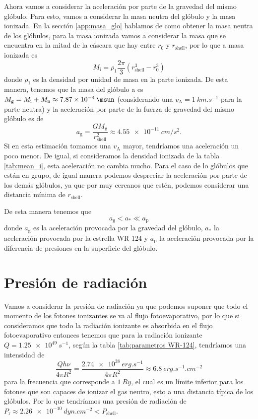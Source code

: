 \documentclass{book}
\begin{document}
Ahora vamos a considerar la aceleración por parte de la gravedad del mismo glóbulo. Para esto, vamos a considerar la masa neutra del glóbulo y la masa ionizada. En la sección \ref{app:masa_glo} hablamos de como obtener la masa neutra de los glóbulos, para la masa ionizada vamos a considerar la masa que se encuentra en la mitad de la cáscara que hay entre $r_0$ y $r_\mathrm{shell}$, por lo que a masa ionizada es
\begin{equation}
    M_\mathrm{i} = \rho_1 \frac{2\pi}{3}(r_\mathrm{shell}^3-r_0^3)
\end{equation}
donde $\rho_1$ es la densidad por unidad de masa en la parte ionizada. De esta manera, tenemos que la masa del glóbulo a es $M_\mathrm{g} = M_\mathrm{i} + M_\mathrm{n} \approx \SI{7.87e-4}{\msun}$ (considerando una $v_\mathrm{A}=\SI{1}{km.s^{-1}}$ para la parte neutra) y la aceleración por parte de la fuerza de gravedad del mismo glóbulo es de
\begin{equation}
a_\mathrm{g}=\frac{G M_\mathrm{g}}{r_\mathrm{shell}^2}\approx \SI{4.55e-11}{cm/s^2}.
\end{equation}
Si en esta estimación tomamos una $v_\mathrm{A}$ mayor, tendríamos una aceleración un poco menor. De igual, si consideramos la densidad ionizada de la tabla \ref{tab:mean_i}, esta aceleración no cambia mucho. Para el caso de lo glóbulos que están en grupo, de igual manera podemos despreciar la aceleración por parte de los demás glóbulos, ya que por muy cercanos que estén, podemos considerar una distancia mínima de $r_\mathrm{shell}$. 

De esta manera tenemos que
\begin{equation}
a_\mathrm{g}<a_*\ll a_\mathrm{p}
\end{equation}
donde $a_\mathrm{g}$ es la aceleración provocada por la gravedad del glóbulo, $a_*$ la aceleración provocada por la estrella WR 124 y $a_\mathrm{p}$ la aceleración provocada por la diferencia de presiones en la superficie del glóbulo.

\section{Presión de radiación}

Vamos a considerar la presión de radiación ya que podemos suponer que todo el momento de los fotones ionizantes se va al flujo fotoevaporativo, por lo que si consideramos que todo la radiación ionizante es absorbida en el flujo fotoevaporativo entonces tenemos que para la radiación ionizante $Q = \SI{1.25e49}{s^{-1}}$, según la tabla \ref{tab:parametros WR-124}, tendríamos una intensidad de 
\begin{equation}
\frac{Q h\nu}{4\pi R^2} = \frac{\SI{2.74e38}{erg.s^{-1}}}{4\pi R^2} \approx \SI{6.8}{erg.s^{-1}.cm^{-2}}
\end{equation}
para la frecuencia que corresponde a  $\SI{1}{Ry}$, el cual es un límite inferior para los fotones que son capaces de ionizar el gas neutro, esto a una distancia típica de los glóbulos. Por lo que tendríamos una presión de radiación de $P_\mathrm{r}\approx \SI{2.26e-10}{dyn.cm^{-2}} < P_\mathrm{shell}$. 
\end{document}
